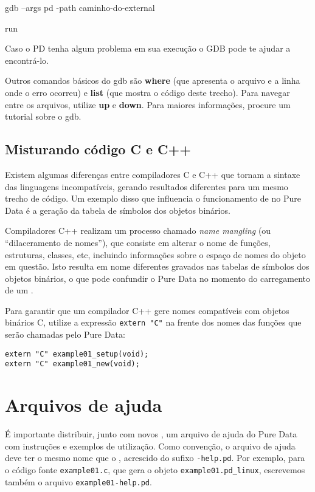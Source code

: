 gdb --args pd -path caminho-do-external

run

Caso o PD tenha algum problema em sua execução o GDB pode te ajudar a encontrá-lo.

Outros comandos básicos do gdb são \textbf{where} (que apresenta o arquivo e a linha onde
o erro ocorreu) e \textbf{list} (que mostra o código deste trecho).
Para navegar entre os arquivos, utilize \textbf{up} e \textbf{down}.
Para maiores informações, procure um tutorial sobre o gdb.

\subsection{Misturando código C e C++}

Existem algumas diferenças entre compiladores C e C++ que tornam a sintaxe das
linguagens incompatíveis, gerando resultados diferentes para um mesmo trecho
de código. Um exemplo disso que influencia o funcionamento de \externals no
Pure Data é a geração da tabela de símbolos dos objetos binários.

Compiladores C++ realizam um processo chamado \emph{name mangling} (ou
``dilaceramento de nomes''), que consiste em alterar o nome de funções,
estruturas, classes, etc, incluindo informações sobre o espaço de nomes do
objeto em questão. Isto resulta em nome diferentes gravados nas tabelas de
símbolos dos objetos binários, o que pode confundir o Pure Data no momento do
carregamento de um \external.

Para garantir que um compilador C++ gere nomes compatíveis com objetos
binários C, utilize a expressão \texttt{extern "C"} na frente dos nomes das
funções que serão chamadas pelo Pure Data:

\begin{lstlisting}[caption=Externalização de código C++]
extern "C" example01_setup(void);
extern "C" example01_new(void);
\end{lstlisting}


\section{Arquivos de ajuda}

É importante distribuir, junto com novos \externals, um arquivo de ajuda do
Pure Data com instruções e exemplos de utilização. Como convenção, o arquivo
de ajuda deve ter o mesmo nome que o \external, acrescido do sufixo
\texttt{-help.pd}. Por exemplo, para o código fonte \texttt{example01.c}, que
gera o objeto \texttt{example01.pd\_linux}, escrevemos também o arquivo
\texttt{example01-help.pd}.

